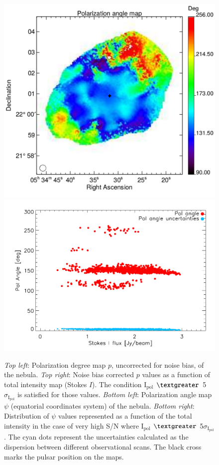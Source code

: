 \documentclass[twocolumn,traditabstract]{aa}
\begin{document}
\begin{figure}
\includegraphics[clip, angle=0, scale = 0.35]{figures/Crab_angle_v3_2mm.pdf}
\includegraphics[clip, angle=0, scale = 0.5]{figures/pol_angle_vs_I_2mm.pdf}
\caption{{\it Top left}: 
Polarization degree map $p$, uncorrected for noise bias, of the  nebula. {\it Top right}: Noise bias
  corrected $p$ values as a function of total intensity map (Stokes $I$). 
  The condition $\textrm{I}_\textrm{pol}$ $\textgreater$ 5$\sigma_{\textrm{I}_\textrm{pol}}$ is satisfied for those values. {\it
    Bottom left}: Polarization angle map $\psi$ (equatorial coordinates system) of the
   nebula. {\it Bottom right}: Distribution of $\psi$ values  represented as a function of the total intensity in the case of very high S/N  where
 $\textrm{I}_\textrm{pol}$ $\textgreater$ 5$\sigma_{\textrm{I}_\textrm{pol}}$. The cyan dots represent the uncertainties calculated as the dispersion between different observational scans. The black cross marks the pulsar position on the maps.
  }
\label{fig:pol_degree}
\end{figure}
\end{document}

